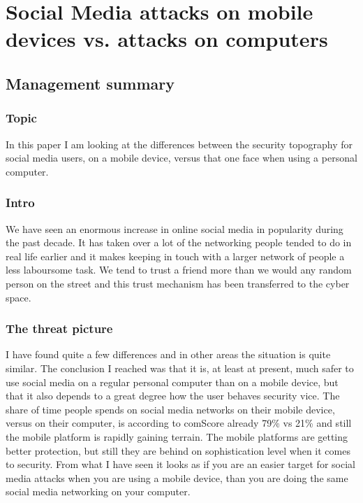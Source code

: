 \chapter[Social Media Attacks]{Social Media attacks on mobile devices vs. attacks on computers}
\section{Management summary}
\subsection*{Topic}
In this paper I am looking at the differences between the security topography for social media users, on a mobile device, versus that one face when using a personal computer.
\subsection*{Intro}
We have seen an enormous increase in online social media in popularity during the past decade. It has taken over a lot of the networking people tended to do in real life earlier and it makes keeping in touch with a larger network of people a less laboursome task. We tend to trust a friend more than we would any random person on the street and this trust mechanism has been transferred to the cyber space.
\subsection*{The threat picture}
I have found quite a few differences and in other areas the situation is quite similar. The conclusion I reached was that it is, at least at present, much safer to use social media on a regular personal computer than on a mobile device, but that it also depends to a great degree how the user behaves security vice. The share of time people spends on social media networks on their mobile device, versus on their computer, is according to comScore already 79\% vs 21\% \cite{CrossPlatform2016} and still the mobile platform is rapidly gaining terrain. The mobile platforms are getting better protection, but still they are behind on sophistication level when it comes to security. From what I have seen it looks as if you are an easier target for social media attacks when you are using a mobile device, than you are doing the same social media networking on your computer.
